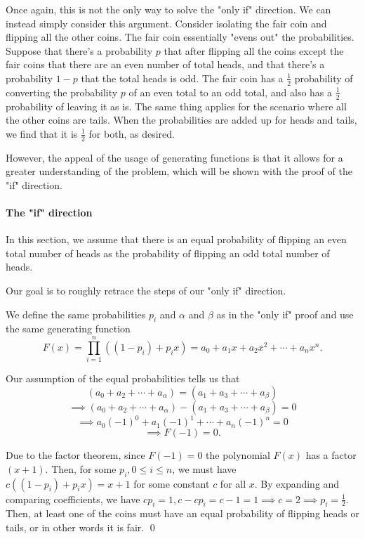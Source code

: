 \documentclass[12pt]{article}
\begin{document}
Once again, this is not the only way to solve the "only if" direction. We can instead simply consider this argument. Consider isolating the fair coin and flipping all the other coins. The fair coin essentially "evens out" the probabilities. Suppose that there's a probability $p$ that after flipping all the coins except the fair coins that there are an even number of total heads, and that there's a probability $1-p$ that the total heads is odd. The fair coin has a $\frac{1}{2}$ probability of converting the probability $p$ of an even total to an odd total, and also has a $\frac{1}{2}$ probability of leaving it as is. The same thing applies for the scenario where all the other coins are tails. When the probabilities are added up for heads and tails, we find that it is $\frac{1}{2}$ for both, as desired.

However, the appeal of the usage of generating functions is that it allows for a greater understanding of the problem, which will be shown with the proof of the "if" direction.

\paragraph{The "if" direction}
In this section, we assume that there is an equal probability of flipping an even total number of heads as the probability of flipping an odd total number of heads.

Our goal is to roughly retrace the steps of our "only if" direction.

We define the same probabilities $p_i$ and $\alpha$ and $\beta$ as in the "only if" proof and use the same generating function \[F(x)=\prod_{i=1}^n ((1-p_i) + p_i x)=a_0 + a_1 x + a_2 x^2 + \cdots + a_n x^n.\]

Our assumption of the equal probabilities tells us that \[(a_0 + a_2 + \cdots + a_{\alpha})=(a_1 + a_3 + \cdots + a_{\beta})\]\[ \implies (a_0 + a_2 + \cdots + a_{\alpha})-(a_1 + a_3 + \cdots + a_{\beta}) = 0\]\[\implies a_0 (-1)^0 + a_1 (-1)^1 + \cdots + a_n (-1)^n = 0\]\[\implies F(-1)=0.\] \begin{sloppypar}Due to the factor theorem, since $F(-1)=0$ the polynomial $F(x)$ has a factor ${(x+1)}$. Then, for some $p_i, 0 \le i \le n$, we must have ${c((1-p_i) + p_i x)=x+1}$ for some constant $c$ for all $x$. By expanding and comparing coefficients, we have
${cp_i = 1, c-cp_i = c-1=1 \implies c=2 \implies p_i = \frac{1}{2}}$. Then, at least one of the coins must have an equal probability of flipping heads or tails, or in other words it is fair. \qed\end{sloppypar}
\end{document}

